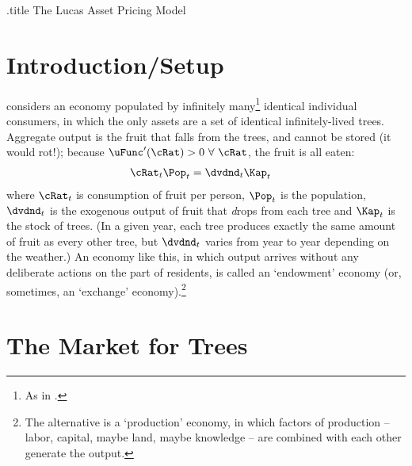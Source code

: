 \documentclass{handout}
\begin{document}
\handoutHeader

\begin{verbatimwrite}{\jobname.title}
The Lucas Asset Pricing Model
\end{verbatimwrite}

\handoutNameMake

\section{Introduction/Setup}
\cite{lucas:assetpricing} considers an economy populated by infinitely many\footnote{As in \Aggregation.}  identical individual consumers, in which the only assets are a set of identical infinitely-lived trees.  Aggregate output is the fruit that falls from the trees, and cannot be stored (it would rot!); because $\uFunc^{\prime}(\cRat)>0~\forall~\cRat$, the fruit is all eaten:
\begin{equation}\begin{gathered}\begin{aligned}
\cRat_{t}\Pop_{t} & =  \dvdnd_{t}\Kap_{t} \label{eq:CeqY}
\end{aligned}\end{gathered}\end{equation}
where $\cRat_{t}$ is consumption of fruit per person, $\Pop_{t}$ is
the population, $\dvdnd_{t}$ is the exogenous output of fruit that
\textit{d}rops from each tree and $\Kap_{t}$ is the stock of
trees.  (In a given year, each tree
produces exactly the same amount of fruit as every other tree, but
$\dvdnd_{t}$ varies from year to year depending on the weather.)  An
economy like this, in which output arrives without any deliberate
actions on the part of residents, is called an `endowment' economy
(or, sometimes, an `exchange' economy).\footnote{The alternative is a `production' economy, in which factors of production -- labor, capital, maybe land, maybe knowledge -- are combined with each other generate the output.}  

\hypertarget{The-Market-for-Trees}{}
\section{The Market for Trees}
\end{document}
